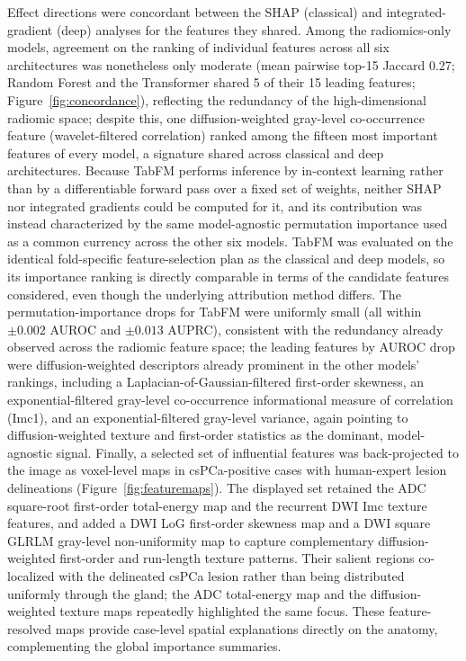 \documentclass[11pt]{article}
\begin{document}
Effect directions were concordant between the SHAP (classical) and
integrated-gradient (deep) analyses for the features they shared. Among the
radiomics-only models, agreement on the ranking of individual features across all
six architectures was nonetheless only moderate (mean pairwise top-15 Jaccard
0.27; Random Forest and the Transformer shared 5 of their 15 leading features;
Figure~\ref{fig:concordance}), reflecting the redundancy of the high-dimensional
radiomic space; despite this, one diffusion-weighted gray-level co-occurrence
feature (wavelet-filtered correlation) ranked among the fifteen most important
features of every model, a signature shared across classical and deep
architectures. Because TabFM performs inference by in-context learning rather
than by a differentiable forward pass over a fixed set of weights, neither SHAP
nor integrated gradients could be computed for it, and its contribution was
instead characterized by the same model-agnostic permutation importance used as
a common currency across the other six models. TabFM was evaluated on the
identical fold-specific feature-selection plan as the classical and deep
models, so its importance ranking is directly comparable in terms of the
candidate features considered, even though the underlying attribution method
differs. The permutation-importance drops for TabFM were uniformly small (all
within $\pm 0.002$ AUROC and $\pm 0.013$ AUPRC), consistent with the redundancy
already observed across the radiomic feature space; the leading features by
AUROC drop were diffusion-weighted descriptors already prominent in the other
models' rankings, including a Laplacian-of-Gaussian-filtered first-order
skewness, an exponential-filtered gray-level co-occurrence informational
measure of correlation (Imc1), and an exponential-filtered gray-level
variance, again pointing to diffusion-weighted texture and first-order
statistics as the dominant, model-agnostic signal. Finally, a selected
set of influential features was back-projected to the image as voxel-level maps
in csPCa-positive cases with human-expert lesion delineations
(Figure~\ref{fig:featuremaps}).
The displayed set retained the ADC square-root first-order total-energy map and
the recurrent DWI Imc texture features, and added a DWI LoG first-order skewness
map and a DWI square GLRLM gray-level non-uniformity map to capture complementary
diffusion-weighted first-order and run-length texture patterns.
Their salient regions co-localized with the delineated csPCa lesion rather than
being distributed uniformly through the gland; the ADC total-energy map and the
diffusion-weighted texture maps repeatedly highlighted the same focus. These
feature-resolved maps provide case-level spatial explanations directly on the
anatomy, complementing the global importance summaries.
\end{document}
